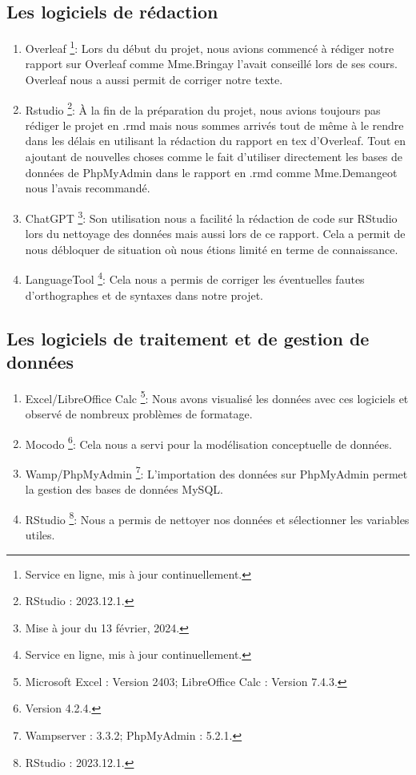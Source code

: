 \documentclass[mstat,12pt]{unswthesis}
\begin{document}
\bigskip

\hypertarget{les-logiciels-de-ruxe9daction}{%
\subsection{Les logiciels de
rédaction}\label{les-logiciels-de-ruxe9daction}}

\begin{enumerate}
\def\labelenumi{\arabic{enumi}.}
\item
  Overleaf \footnote{Service en ligne, mis à jour continuellement.}:
  Lors du début du projet, nous avions commencé à rédiger notre rapport
  sur Overleaf comme Mme.Bringay l'avait conseillé lors de ses cours.
  Overleaf nous a aussi permit de corriger notre texte.
\item
  Rstudio \footnote{RStudio : 2023.12.1.}: À la fin de la préparation du
  projet, nous avions toujours pas rédiger le projet en .rmd mais nous
  sommes arrivés tout de même à le rendre dans les délais en utilisant
  la rédaction du rapport en tex d'Overleaf. Tout en ajoutant de
  nouvelles choses comme le fait d'utiliser directement les bases de
  données de PhpMyAdmin dans le rapport en .rmd comme Mme.Demangeot nous
  l'avais recommandé.
\item
  ChatGPT \footnote{Mise à jour du 13 février, 2024.}: Son utilisation
  nous a facilité la rédaction de code sur RStudio lors du nettoyage des
  données mais aussi lors de ce rapport. Cela a permit de nous débloquer
  de situation où nous étions limité en terme de connaissance.
\item
  LanguageTool \footnote{Service en ligne, mis à jour continuellement.}:
  Cela nous a permis de corriger les éventuelles fautes d'orthographes
  et de syntaxes dans notre projet.
\end{enumerate}

\newpage

\hypertarget{les-logiciels-de-traitement-et-de-gestion-de-donnuxe9es}{%
\subsection{Les logiciels de traitement et de gestion de
données}\label{les-logiciels-de-traitement-et-de-gestion-de-donnuxe9es}}

\begin{enumerate}
\def\labelenumi{\arabic{enumi}.}
\item
  Excel/LibreOffice Calc \footnote{Microsoft Excel : Version 2403;
    LibreOffice Calc : Version 7.4.3.}: Nous avons visualisé les données
  avec ces logiciels et observé de nombreux problèmes de formatage.
\item
  Mocodo \footnote{Version 4.2.4.}: Cela nous a servi pour la
  modélisation conceptuelle de données.
\item
  Wamp/PhpMyAdmin \footnote{Wampserver : 3.3.2; PhpMyAdmin : 5.2.1.}:
  L'importation des données sur PhpMyAdmin permet la gestion des bases
  de données MySQL.
\item
  RStudio \footnote{RStudio : 2023.12.1.}: Nous a permis de nettoyer nos
  données et sélectionner les variables utiles.
\end{enumerate}
\end{document}
